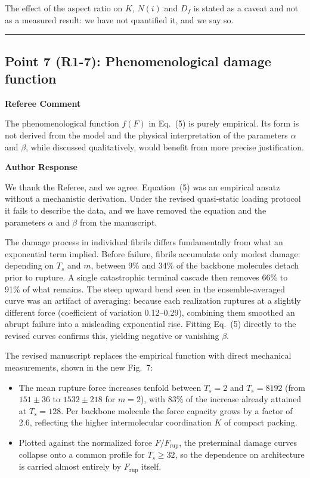 \documentclass[11pt]{article}
\newenvironment{refereecomment}
  {%
    \par
    \begingroup
    \color{commentgray}
    \itshape
    \setlength{\leftskip}{1.4em}
    \setlength{\rightskip}{1.4em}
  }
  {%
    \par
    \endgroup
  }
\newcommand{\refereelabel}{%
  \par\smallskip
  {\color{commentgray}\bfseries Referee Comment}\par
}
\newcommand{\responselabel}{%
  \par\medskip
  {\color{responseblue}\bfseries Author Response}\par
}
\newcommand{\pointseparator}{%
  \par\bigskip
  {\color{rulegray}\hrule}
  \par\bigskip
}
\begin{document}
The effect of the aspect ratio on $K$, $N(i)$ and $D_f$ is stated as a caveat
and not as a measured result: we have not quantified it, and we say so.


\pointseparator


\subsection*{Point 7 (R1-7): Phenomenological damage function}

\refereelabel
\begin{refereecomment}
  The phenomenological function \(f(F)\) in Eq.~(5) is purely empirical. Its
  form is not derived from the model and the physical interpretation of the
  parameters \(\alpha\) and \(\beta\), while discussed qualitatively, would
  benefit from more precise justification.
\end{refereecomment}

\responselabel

We thank the Referee, and we agree. Equation~(5) was an empirical ansatz without
a mechanistic derivation. Under the revised quasi-static loading protocol it
fails to describe the data, and we have removed the equation and the parameters
$\alpha$ and $\beta$ from the manuscript.

The damage process in individual fibrils differs fundamentally from what an
exponential term implied. Before failure, fibrils accumulate only modest damage:
depending on $T_s$ and $m$, between 9\% and 34\% of the backbone molecules
detach prior to rupture. A single catastrophic terminal cascade then removes 66\%
to 91\% of what remains. The steep upward bend seen in the ensemble-averaged
curve was an artifact of averaging: because each realization ruptures at a
slightly different force (coefficient of variation 0.12--0.29), combining them
smoothed an abrupt failure into a misleading exponential rise. Fitting Eq.~(5)
directly to the revised curves confirms this, yielding negative or vanishing
$\beta$.

The revised manuscript replaces the empirical function with direct mechanical
measurements, shown in the new Fig.~7:

\begin{itemize}\itemsep0.2em
\item The mean rupture force increases tenfold between $T_s=2$ and $T_s=8192$
(from $151\pm36$ to $1532\pm218$ for $m=2$), with 83\% of the increase already
attained at $T_s=128$. Per backbone molecule the force capacity grows by a
factor of 2.6, reflecting the higher intermolecular coordination $K$ of compact
packing.
\item Plotted against the normalized force $F/F_{\mathrm{rup}}$, the preterminal
damage curves collapse onto a common profile for $T_s\ge32$, so the dependence
on architecture is carried almost entirely by $F_{\mathrm{rup}}$ itself.
\end{itemize}
\end{document}
